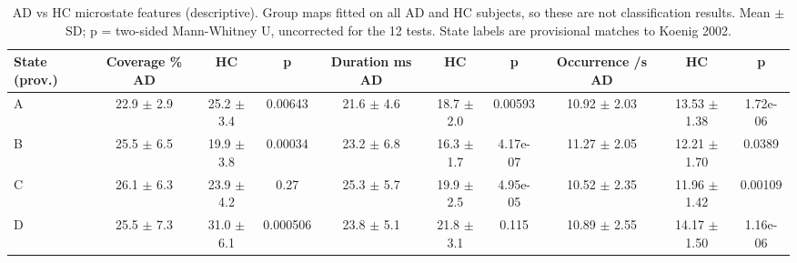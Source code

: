 \begin{table}[!t]
\centering
\footnotesize
\caption{AD vs HC microstate features (descriptive). Group maps fitted on all AD and HC subjects, so these are not classification results. Mean $\pm$ SD; p = two-sided Mann-Whitney U, uncorrected for the 12 tests. State labels are provisional matches to Koenig 2002.}
\label{tab:table6_microstate_features}
\begin{tabular}{lccccccccc}
\toprule
State (prov.) & Coverage \% AD & HC & p & Duration ms AD & HC & p & Occurrence /s AD & HC & p \\
\midrule
A & 22.9 $\pm$ 2.9 & 25.2 $\pm$ 3.4 & 0.00643 & 21.6 $\pm$ 4.6 & 18.7 $\pm$ 2.0 & 0.00593 & 10.92 $\pm$ 2.03 & 13.53 $\pm$ 1.38 & 1.72e-06 \\
B & 25.5 $\pm$ 6.5 & 19.9 $\pm$ 3.8 & 0.00034 & 23.2 $\pm$ 6.8 & 16.3 $\pm$ 1.7 & 4.17e-07 & 11.27 $\pm$ 2.05 & 12.21 $\pm$ 1.70 & 0.0389 \\
C & 26.1 $\pm$ 6.3 & 23.9 $\pm$ 4.2 & 0.27 & 25.3 $\pm$ 5.7 & 19.9 $\pm$ 2.5 & 4.95e-05 & 10.52 $\pm$ 2.35 & 11.96 $\pm$ 1.42 & 0.00109 \\
D & 25.5 $\pm$ 7.3 & 31.0 $\pm$ 6.1 & 0.000506 & 23.8 $\pm$ 5.1 & 21.8 $\pm$ 3.1 & 0.115 & 10.89 $\pm$ 2.55 & 14.17 $\pm$ 1.50 & 1.16e-06 \\
\bottomrule
\end{tabular}
\end{table}
